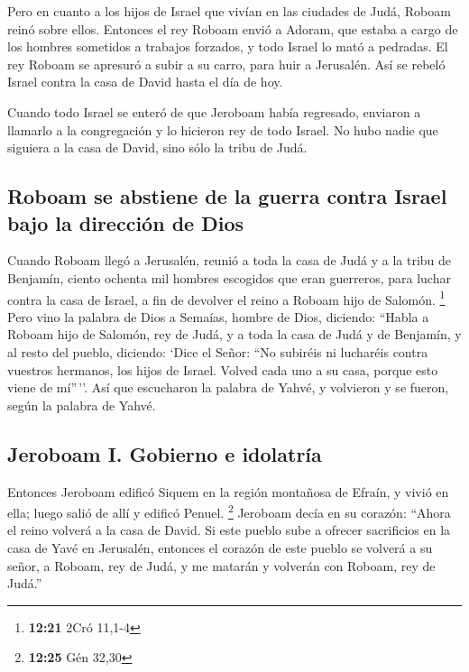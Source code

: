 \begin{paracol}{2}
 Pero en cuanto a los hijos de Israel que vivían en las
ciudades de Judá, Roboam reinó sobre ellos.  Entonces el
rey Roboam envió a Adoram, que estaba a cargo de los hombres sometidos a
trabajos forzados, y todo Israel lo mató a pedradas. El rey Roboam se
apresuró a subir a su carro, para huir a Jerusalén.  Así
se rebeló Israel contra la casa de David hasta el día de hoy.

 Cuando todo Israel se enteró de que Jeroboam había
regresado, enviaron a llamarlo a la congregación y lo hicieron rey de
todo Israel. No hubo nadie que siguiera a la casa de David, sino sólo la
tribu de Judá.

\hypertarget{roboam-se-abstiene-de-la-guerra-contra-israel-bajo-la-direcciuxf3n-de-dios}{%
\subsection{Roboam se abstiene de la guerra contra Israel bajo la
dirección de
Dios}\label{roboam-se-abstiene-de-la-guerra-contra-israel-bajo-la-direcciuxf3n-de-dios}}

 Cuando Roboam llegó a Jerusalén, reunió a toda la casa
de Judá y a la tribu de Benjamín, ciento ochenta mil hombres escogidos
que eran guerreros, para luchar contra la casa de Israel, a fin de
devolver el reino a Roboam hijo de Salomón. \footnote{\textbf{12:21}
  2Cró 11,1-4}  Pero vino la palabra de Dios a Semaías,
hombre de Dios, diciendo:  ``Habla a Roboam hijo de
Salomón, rey de Judá, y a toda la casa de Judá y de Benjamín, y al resto
del pueblo, diciendo:  `Dice el Señor: ``No subiréis ni
lucharéis contra vuestros hermanos, los hijos de Israel. Volved cada uno
a su casa, porque esto viene de mí''\,''. Así que escucharon la palabra
de Yahvé, y volvieron y se fueron, según la palabra de Yahvé.

\hypertarget{jeroboam-i.-gobierno-e-idolatruxeda}{%
\subsection{Jeroboam I. Gobierno e
idolatría}\label{jeroboam-i.-gobierno-e-idolatruxeda}}

 Entonces Jeroboam edificó Siquem en la región montañosa
de Efraín, y vivió en ella; luego salió de allí y edificó Penuel.
\footnote{\textbf{12:25} Gén 32,30}  Jeroboam decía en su
corazón: ``Ahora el reino volverá a la casa de David.  Si
este pueblo sube a ofrecer sacrificios en la casa de Yavé en Jerusalén,
entonces el corazón de este pueblo se volverá a su señor, a Roboam, rey
de Judá, y me matarán y volverán con Roboam, rey de Judá.''


\end{paracol}
